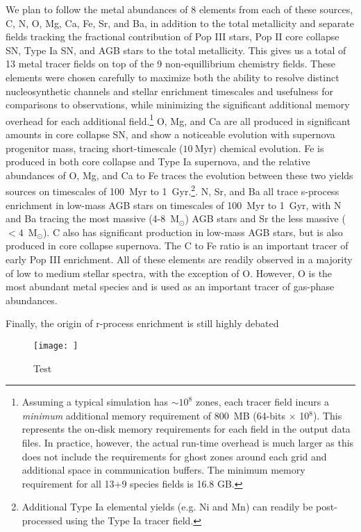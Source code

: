 \documentclass[12pt]{article} %
\begin{document}
We plan to follow the metal abundances of 8 elements from each of these sources, C, N, O, Mg, Ca, Fe, Sr, and Ba, in addition to the total metallicity and separate fields tracking the fractional contribution of Pop III stars, Pop II core collapse SN, Type Ia SN, and AGB stars to the total metallicity. This gives us a total of 13 metal tracer fields on top of the 9 non-equillibrium chemistry fields. These elements were chosen carefully to maximize both the ability to resolve distinct nucleosynthetic channels and stellar enrichment timescales and usefulness for comparisons to observations, while minimizing the significant additional memory overhead for each additional field.\footnote{Assuming a typical simulation has $\sim10^8$ zones, each tracer field incurs a \textit{minimum} additional memory requirement of 800~MB  (64-bits $\times$ 10$^8$). This represents the on-disk memory requirements for each field in the output data files. In practice, however, the actual run-time overhead is much larger as this does not include the requirements for ghost zones around each grid and additional space in communication buffers. The minimum memory requirement for all 13+9 species fields is 16.8 GB.} O, Mg, and Ca are all produced in significant amounts in core collapse SN, and show a noticeable evolution with supernova progenitor mass, tracing short-timescale ($10~$Myr) chemical evolution. Fe is produced in both core collapse and Type Ia supernova, and the relative abundances of O, Mg, and Ca to Fe traces the evolution between these two yields sources on timescales of 100~Myr to 1~Gyr.\footnote{Additional Type Ia elemental yields (e.g. Ni and Mn) can readily be post-processed using the Type Ia tracer field.}. N, Sr, and Ba all trace s-process enrichment in low-mass AGB stars on timescales of 100~Myr to 1~Gyr, with N and Ba tracing the most massive (4-8~M$_{\odot}$) AGB stars and Sr the less massive ($<4$~M$_{\odot}$). C also has significant production in low-mass AGB stars, but is also produced in core collapse supernova. The C to Fe ratio is an important tracer of early Pop III enrichment. All of these elements are readily observed in a majority of low to medium stellar spectra, with the exception of O. However, O is the most abundant metal species and is used as an important tracer of gas-phase abundances.

Finally, the origin of r-process enrichment is still highly debated \citep[e.g.][]{}

\begin{figure}
\centering
\texttt{[image: ]}
\caption{Test}
\label{fig:schematic}
\end{figure}
\end{document}
